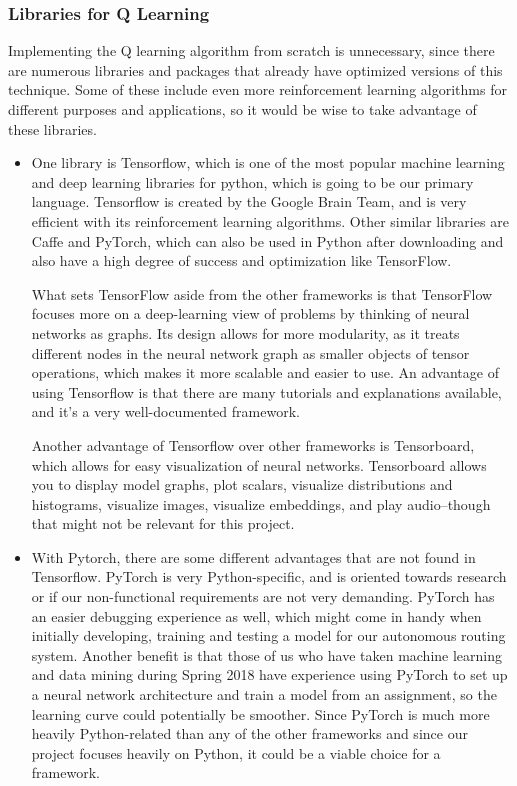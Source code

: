 \documentclass[onecolumn, draftclsnofoot,10pt, compsoc]{IEEEtran}
\begin{document}
\subsubsection{Libraries for Q Learning}
Implementing the Q learning algorithm from scratch is unnecessary, since there are numerous libraries and packages that already have optimized versions of this technique.
Some of these include even more reinforcement learning algorithms for different purposes and applications, so it would be wise to take advantage of these libraries.
\begin{itemize}
\item
One library is Tensorflow, which is one of the most popular machine learning and deep learning libraries for python, which is going to be our primary language.
Tensorflow is created by the Google Brain Team, and is very efficient with its reinforcement learning algorithms.
Other similar libraries are Caffe and PyTorch, which can also be used in Python after downloading and also have a high degree of success and optimization like TensorFlow.

What sets TensorFlow aside from the other frameworks is that TensorFlow focuses more on a deep-learning view of problems by thinking of neural networks as graphs.
Its design allows for more modularity, as it treats different nodes in the neural network graph as smaller objects of tensor operations, which makes it more scalable and easier to use.
An advantage of using Tensorflow is that there are many tutorials and explanations available, and it's a very well-documented framework.

Another advantage of Tensorflow over other frameworks is Tensorboard, which allows for easy visualization of neural networks.
Tensorboard allows you to display model graphs, plot scalars, visualize distributions and histograms, visualize images, visualize embeddings, and play audio--though that might not be relevant for this project.
\item
With Pytorch, there are some different advantages that are not found in Tensorflow.
PyTorch is very Python-specific, and is oriented towards research or if our non-functional requirements are not very demanding.
PyTorch has an easier debugging experience as well, which might come in handy when initially developing, training and testing a model for our autonomous routing system.
Another benefit is that those of us who have taken machine learning and data mining during Spring 2018 have experience using PyTorch to set up a neural network architecture and train a model from an assignment, so the learning curve could potentially be smoother.
Since PyTorch is much more heavily Python-related than any of the other frameworks and since our project focuses heavily on Python, it could be a viable choice for a framework.
\end{itemize}
\end{document}
